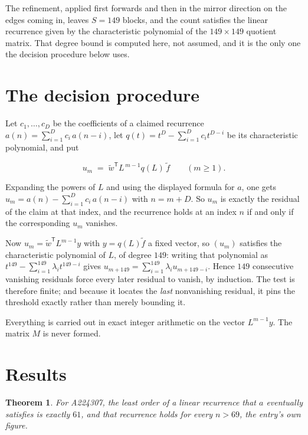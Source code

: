 \documentclass[11pt]{article}
\newtheorem{theorem}{Theorem}
\theoremstyle{definition}
\begin{document}
The refinement, applied first forwards and then in the mirror direction on the edges coming in, leaves $S = 149$ blocks, and the count satisfies the linear recurrence given by the characteristic polynomial of the $149 \times 149$ quotient matrix. That degree bound is computed here, not assumed, and it is the only one the decision procedure below uses.

\section{The decision procedure}

Let $c_1,\dots,c_D$ be the coefficients of a claimed recurrence $a(n) = \sum_{i=1}^{D} c_i\,a(n-i)$, let $q(t) = t^{D} - \sum_{i=1}^{D} c_i t^{D-i}$ be its characteristic polynomial, and put

\[u_m \;=\; \tilde w^{\mathsf T} L^{\,m-1} q(L)\,\tilde f \qquad (m \ge 1).\]

Expanding the powers of $L$ and using the displayed formula for $a$, one gets $u_m = a(n) - \sum_{i=1}^{D} c_i\,a(n-i)$ with $n = m + D$. So $u_m$ is exactly the residual of the claim at that index, and the recurrence holds at an index $n$ if and only if the corresponding $u_m$ vanishes.

Now $u_m = \tilde w^{\mathsf T} L^{m-1} y$ with $y = q(L)\tilde f$ a fixed vector, so $(u_m)$ satisfies the characteristic polynomial of $L$, of degree $149$: writing that polynomial as $t^{149} - \sum_{i=1}^{149} \lambda_i t^{149-i}$ gives $u_{m+149} = \sum_{i=1}^{149} \lambda_i u_{m+149-i}$. Hence $149$ consecutive vanishing residuals force every later residual to vanish, by induction. The test is therefore finite; and because it locates the {\itshape last} nonvanishing residual, it pins the threshold exactly rather than merely bounding it.

Everything is carried out in exact integer arithmetic on the vector $L^{m-1}y$. The matrix $M$ is never formed.

\section{Results}

\begin{theorem} For A224307, the least order of a linear recurrence that $a$ eventually satisfies is exactly $61$, and that recurrence holds for every $n > 69$, the entry's own figure.\end{theorem}
\end{document}
